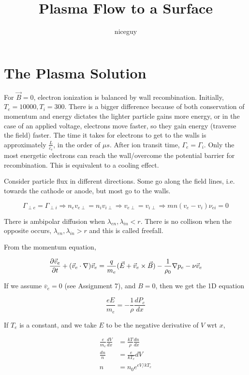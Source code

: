 \documentclass[12pt]{article}
\title{Plasma Flow to a Surface}
\author{niceguy}
\begin{document}
\maketitle

\section{The Plasma Solution}

For $\vec B = 0$, electron ionization is balanced by wall recombination. Initially, $T_e = 10000, T_i = 300$. There is a bigger difference because of both conservation of momentum and energy dictates the lighter particle gains more energy, or in the case of an applied voltage, electrons move faster, so they gain energy (traverse the field) faster. The time it takes for electrons to get to the walls is approximately $\frac{L}{\overline c_e}$, in the order of $\unit{\mu s}$. After ion transit time, $\Gamma_e = \Gamma_i$. Only the most energetic electrons can reach the wall/overcome the potential barrier for recombination. This is equivalent to a cooling effect.

Consider particle flux in different directions. Some go along the field lines, i.e. towards the cathode or anode, but most go to the walls.

$$\Gamma_{\perp e} = \Gamma_{\perp i} \Rightarrow n_ev_{e\perp} = n_iv_{i\perp} \Rightarrow v_{e\perp} = v_{i\perp} \Rightarrow mn(v_e - v_i)\nu_{ei} = 0$$

There is ambipolar diffusion when $\lambda_{en}, \lambda_{in} < r$. There is no collison when the opposite occurs, $\lambda_{en},\lambda_{in} > r$ and this is called freefall.

From the momentum equation,

$$\frac{\partial \vec v_e}{\partial t} + (\vec v_e \cdot \nabla) \vec v_e = \frac{q}{m_e} (\vec E + \vec v_e \times \vec B) - \frac{1}{\rho_0} \nabla p_e - \nu\vec v_e$$

If we assume $\overline v_e = 0$ (see Assignment 7), and $B=0$, then we get the 1D equation

$$\frac{eE}{m_e} = -\frac{1}{\rho} \frac{dP_e}{dx}$$

If $T_e$ is a constant, and we take $E$ to be the negative derivative of $V$ wrt $x$,

\begin{align*}
    \frac{e}{m_e} \frac{dV}{dx} &= \frac{kT}{\rho} \frac{dn}{dx} \\
    \frac{dn}{n} &= \frac{e}{kT_e} dV \\
    n &= n_0e^{eV/kT_e}
\end{align*}
\end{document}
